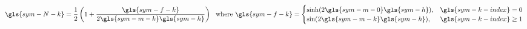 \documentclass[a4paper,fleqn,colorlinks,unicode,lineno]{cas-dc} %
\providecommand{\DIFaddbegin}{} %
\providecommand{\DIFaddend}{} %
\providecommand{\DIFdelbegin}{} %
\providecommand{\DIFdelend}{} %
\providecommand{\DIFscaledelfig}{0.5}
\newlength{\DIFdelgraphicswidth} %
\newlength{\DIFdelgraphicsheight} %
\providecommand{\DIFaddincludegraphics}[2][]{{\color{blue}\fbox{\DIFOincludegraphics[#1]{#2}}}} %
\providecommand{\DIFdelincludegraphics}[2][]{%
\sbox{\DIFdelgraphicsbox}{\DIFOincludegraphics[#1]{#2}}%
\settoboxwidth{\DIFdelgraphicswidth}{\DIFdelgraphicsbox} %
\settoboxtotalheight{\DIFdelgraphicsheight}{\DIFdelgraphicsbox} %
\scalebox{\DIFscaledelfig}{%
\parbox[b]{\DIFdelgraphicswidth}{\usebox{\DIFdelgraphicsbox}\\[-\baselineskip] \rule{\DIFdelgraphicswidth}{0em}}\llap{\resizebox{\DIFdelgraphicswidth}{\DIFdelgraphicsheight}{%
\setlength{\unitlength}{\DIFdelgraphicswidth}%
\begin{picture}(1,1)%
\thicklines\linethickness{2pt} %
{\color[rgb]{1,0,0}\put(0,0){\framebox(1,1){}}}%
{\color[rgb]{1,0,0}\put(0,0){\line( 1,1){1}}}%
{\color[rgb]{1,0,0}\put(0,1){\line(1,-1){1}}}%
\end{picture}%
}\hspace*{3pt}}} %
} %
\DeclareRobustCommand{\DIFaddbegin}{\DIFOaddbegin \let\includegraphics\DIFaddincludegraphics} %
\DeclareRobustCommand{\DIFaddend}{\DIFOaddend \let\includegraphics\DIFOincludegraphics} %
\DeclareRobustCommand{\DIFdelbegin}{\DIFOdelbegin \let\includegraphics\DIFdelincludegraphics} %
\DeclareRobustCommand{\DIFdelend}{\DIFOaddend \let\includegraphics\DIFOincludegraphics} %
\begin{document}
\begin{equation}
    \gls{sym-N-k} = \frac{1}{2}\left(1+\frac{\gls{sym-f-k}}{2\gls{sym-m-k}\gls{sym-h}}   \right)~
    \textrm{ where }
    \gls{sym-f-k} =
    \DIFdelbegin %
\DIFdelend \DIFaddbegin \begin{cases}
        \sinh(2\gls{sym-m-0}\gls{sym-h}), & \gls{sym-k-index}=0 \\ \sin(2\gls{sym-m-k}\gls{sym-h}), & \gls{sym-k-index}\geq1
    \end{cases}\DIFaddend 
\end{equation}

\DIFdelbegin %
\DIFdelend \DIFaddbegin \newcommand{\RintOneDefn}{
    \shortstack{
        $\displaystyle
            \gls{sym-boldsymbol-mathcal-R}_{1j} =
            \int\limits_{\gls{sym-a-in}}^{\gls{sym-a-out}} \gls{sym-vec-R}_{1j} (\gls{sym-r})\gls{sym-r} dr$
        \\
            for $\gls{sym-j}= (\gls{sym-n},\gls{sym-m})
        $
    }
}
\DIFaddend 

\DIFdelbegin %
\DIFdelend \DIFaddbegin \newcommand{\RintTwoDefn}{
    $\displaystyle \gls{sym-boldsymbol-mathcal-R}_{2\gls{sym-m}} = \int\limits_{\gls{sym-a-in}}^{\gls{sym-a-out}} \gls{sym-vec-R}_{2\gls{sym-m}}(\gls{sym-r})rdr$
}
\DIFaddend 
\end{document}
